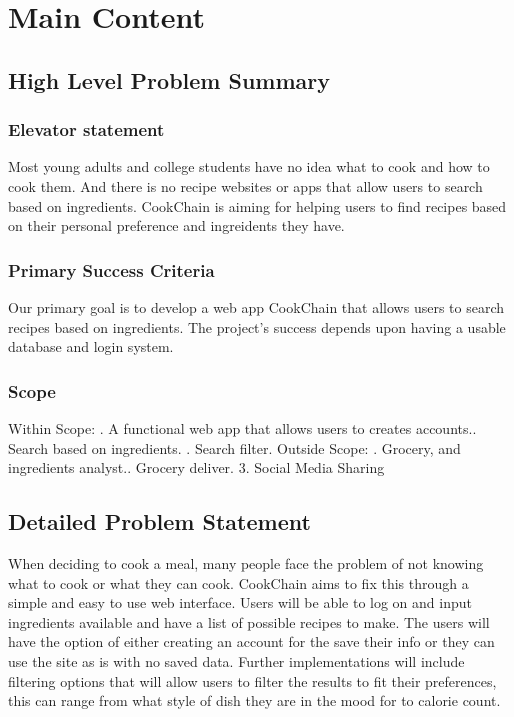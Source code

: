 \documentclass{article}
\begin{document}
\section{Main Content}
\subsection{High Level Problem Summary}
\subsubsection{Elevator statement}
Most young adults and college students have no idea what to cook and how to cook them. And there is no recipe websites or apps that allow users to search based on ingredients. CookChain is aiming for helping users to find recipes based on their personal preference and ingreidents they have.
\subsubsection{Primary Success Criteria}
Our primary goal is to develop a web app CookChain that allows users to search recipes based on ingredients. The project's success depends upon having a usable database and login system.
\subsubsection{Scope}
Within Scope: . A functional web app that allows users to creates accounts.. Search based on ingredients. . Search filter.\newline
Outside Scope: . Grocery, and ingredients analyst.. Grocery deliver.
3. Social Media Sharing
\subsection{Detailed Problem Statement}
When deciding to cook a meal, many people face the problem of not knowing what to cook or what they can cook. CookChain aims to fix this through a simple and easy to use web interface. Users will be able to log on and input ingredients available and have a list of possible recipes to make. The users will have the option of either creating an account for the save their info or they can use the site as is with no saved data. Further implementations will include filtering options that will allow users to filter the results to fit their preferences, this can range from what style of dish they are in the mood for to calorie count.
\clearpage
\end{document}
